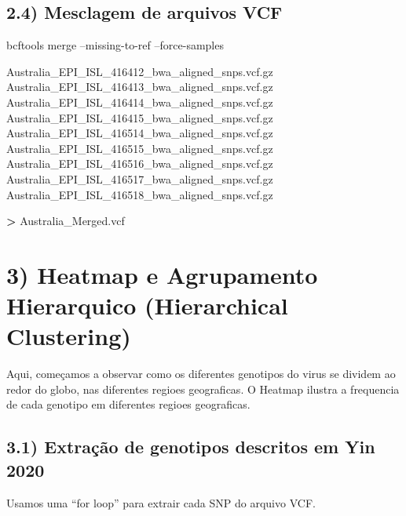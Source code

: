 \documentclass[
]{article}
\newenvironment{Shaded}{\begin{snugshade}}{\end{snugshade}}
\newcommand{\ExtensionTok}[1]{#1}
\newcommand{\FunctionTok}[1]{\textcolor[rgb]{0.00,0.00,0.00}{#1}}
\newcommand{\KeywordTok}[1]{\textcolor[rgb]{0.13,0.29,0.53}{\textbf{#1}}}
\newcommand{\NormalTok}[1]{#1}
\newcommand{\OperatorTok}[1]{\textcolor[rgb]{0.81,0.36,0.00}{\textbf{#1}}}
\newcommand{\VariableTok}[1]{\textcolor[rgb]{0.00,0.00,0.00}{#1}}
\begin{document}
\hypertarget{mesclagem-de-arquivos-vcf}{%
\subsection{2.4) Mesclagem de arquivos
VCF}\label{mesclagem-de-arquivos-vcf}}

\begin{Shaded}
\begin{Highlighting}[]
\ExtensionTok{bcftools}\NormalTok{ merge --missing-to-ref --force-samples}

\ExtensionTok{Australia_EPI_ISL_416412_bwa_aligned_snps.vcf.gz}
\ExtensionTok{Australia_EPI_ISL_416413_bwa_aligned_snps.vcf.gz}
\ExtensionTok{Australia_EPI_ISL_416414_bwa_aligned_snps.vcf.gz}
\ExtensionTok{Australia_EPI_ISL_416415_bwa_aligned_snps.vcf.gz}
\ExtensionTok{Australia_EPI_ISL_416514_bwa_aligned_snps.vcf.gz}
\ExtensionTok{Australia_EPI_ISL_416515_bwa_aligned_snps.vcf.gz}
\ExtensionTok{Australia_EPI_ISL_416516_bwa_aligned_snps.vcf.gz}
\ExtensionTok{Australia_EPI_ISL_416517_bwa_aligned_snps.vcf.gz}
\ExtensionTok{Australia_EPI_ISL_416518_bwa_aligned_snps.vcf.gz}

\OperatorTok{>} \ExtensionTok{Australia_Merged.vcf}
\end{Highlighting}
\end{Shaded}

\hypertarget{heatmap-e-agrupamento-hierarquico-hierarchical-clustering}{%
\section{3) Heatmap e Agrupamento Hierarquico (Hierarchical
Clustering)}\label{heatmap-e-agrupamento-hierarquico-hierarchical-clustering}}

Aqui, começamos a observar como os diferentes genotipos do virus se
dividem ao redor do globo, nas diferentes regioes geograficas. O Heatmap
ilustra a frequencia de cada genotipo em diferentes regioes geograficas.

\hypertarget{extrauxe7uxe3o-de-genotipos-descritos-em-yin-2020}{%
\subsection{3.1) Extração de genotipos descritos em Yin
2020}\label{extrauxe7uxe3o-de-genotipos-descritos-em-yin-2020}}

Usamos uma ``for loop'' para extrair cada SNP do arquivo VCF.

\begin{Shaded}
\end{Shaded}
\end{document}
